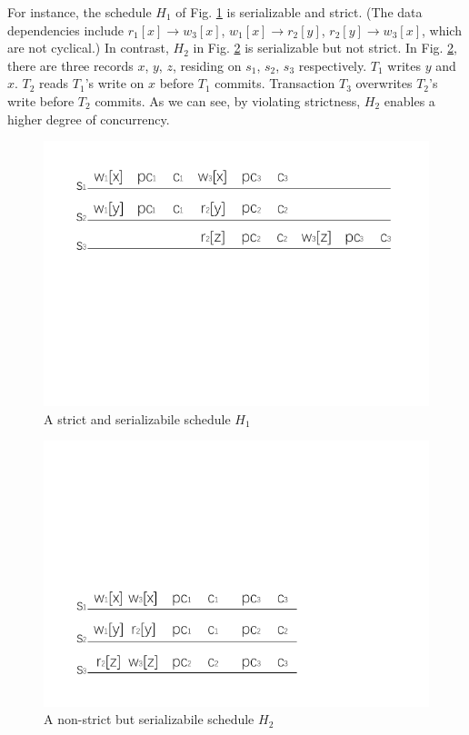 \documentclass[conference]{IEEEtran}
\begin{document}
For instance, the schedule ${H_1}$ of Fig. \ref{fig:strict_example} is serializable and strict. 
(The data dependencies include ${r_1[x] \rightarrow w_3[x]}$, ${w_1[x] \rightarrow r_2[y]}$, ${r_2[y] \rightarrow w_3[x]}$, which are not cyclical.)
In contrast, ${H_2}$ in Fig. \ref{fig:non_strict_example} is serializable but not strict.
In Fig.    \ref{fig:non_strict_example}, there are three records ${x}$, ${y}$, ${z}$, residing on ${s_1}$, ${s_2}$, ${s_3}$ respectively.
${T_1}$ writes ${y}$ and ${x}$.
${T_2}$ reads ${T_1}$'s write on ${x}$ before ${T_1}$ commits.
Transaction ${T_3}$ overwrites ${T_2}$'s write before ${T_2}$ commits.
As we can see, by violating strictness, ${H_2}$  enables a higher degree of concurrency.


\begin{figure}[tbp]
  \centerline{\includegraphics[scale=1]{figure/schedule_strict.pdf}}
  \caption{A strict and serializabile schedule ${H_1}$}
  \label{fig:strict_example}
\end{figure}

\begin{figure}[tbp]
  \centerline{\includegraphics[scale=1]{figure/schedule_non_strict.pdf}}
  \caption{A non-strict but serializabile schedule ${H_2}$}
  \label{fig:non_strict_example}
\end{figure}
\end{document}
